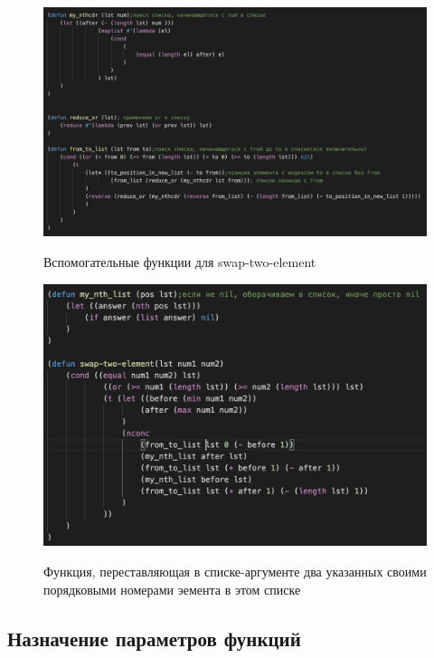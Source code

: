 \documentclass[a4paper,12pt]{article}
\begin{document}
	\begin{figure}[h!]
		\begin{center}
			{\includegraphics[scale = 0.6]{5.2.png}}
			\label{ris:5.2}
		\end{center}
	\caption{Вспомогательные функции для swap-two-element}
	\end{figure}

	\begin{figure}[h!]
		\begin{center}
			{\includegraphics[scale = 0.8]{5.1.png}}
			\label{ris:5.1}
		\end{center}
	\caption{Функция, переставляющая в списке-аргументе два указанных своими порядковыми номерами эемента в этом списке}
	\end{figure}

	\newpage
	
	\subsection*{Назначение параметров функций}
	
\end{document}
